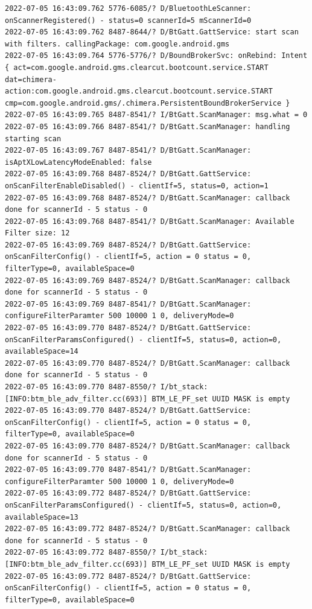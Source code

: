 \documentclass[a4paper,12pt]{book}
\begin{document}
\begin{lstlisting}
2022-07-05 16:43:09.762 5776-6085/? D/BluetoothLeScanner: onScannerRegistered() - status=0 scannerId=5 mScannerId=0
2022-07-05 16:43:09.762 8487-8644/? D/BtGatt.GattService: start scan with filters. callingPackage: com.google.android.gms
2022-07-05 16:43:09.764 5776-5776/? D/BoundBrokerSvc: onRebind: Intent { act=com.google.android.gms.clearcut.bootcount.service.START dat=chimera-action:com.google.android.gms.clearcut.bootcount.service.START cmp=com.google.android.gms/.chimera.PersistentBoundBrokerService }
2022-07-05 16:43:09.765 8487-8541/? I/BtGatt.ScanManager: msg.what = 0
2022-07-05 16:43:09.766 8487-8541/? D/BtGatt.ScanManager: handling starting scan
2022-07-05 16:43:09.767 8487-8541/? D/BtGatt.ScanManager: isAptXLowLatencyModeEnabled: false
2022-07-05 16:43:09.768 8487-8524/? D/BtGatt.GattService: onScanFilterEnableDisabled() - clientIf=5, status=0, action=1
2022-07-05 16:43:09.768 8487-8524/? D/BtGatt.ScanManager: callback done for scannerId - 5 status - 0
2022-07-05 16:43:09.768 8487-8541/? D/BtGatt.ScanManager: Available Filter size: 12
2022-07-05 16:43:09.769 8487-8524/? D/BtGatt.GattService: onScanFilterConfig() - clientIf=5, action = 0 status = 0, filterType=0, availableSpace=0
2022-07-05 16:43:09.769 8487-8524/? D/BtGatt.ScanManager: callback done for scannerId - 5 status - 0
2022-07-05 16:43:09.769 8487-8541/? D/BtGatt.ScanManager: configureFilterParamter 500 10000 1 0, deliveryMode=0
2022-07-05 16:43:09.770 8487-8524/? D/BtGatt.GattService: onScanFilterParamsConfigured() - clientIf=5, status=0, action=0, availableSpace=14
2022-07-05 16:43:09.770 8487-8524/? D/BtGatt.ScanManager: callback done for scannerId - 5 status - 0
2022-07-05 16:43:09.770 8487-8550/? I/bt_stack: [INFO:btm_ble_adv_filter.cc(693)] BTM_LE_PF_set UUID MASK is empty 
2022-07-05 16:43:09.770 8487-8524/? D/BtGatt.GattService: onScanFilterConfig() - clientIf=5, action = 0 status = 0, filterType=0, availableSpace=0
2022-07-05 16:43:09.770 8487-8524/? D/BtGatt.ScanManager: callback done for scannerId - 5 status - 0
2022-07-05 16:43:09.770 8487-8541/? D/BtGatt.ScanManager: configureFilterParamter 500 10000 1 0, deliveryMode=0
2022-07-05 16:43:09.772 8487-8524/? D/BtGatt.GattService: onScanFilterParamsConfigured() - clientIf=5, status=0, action=0, availableSpace=13
2022-07-05 16:43:09.772 8487-8524/? D/BtGatt.ScanManager: callback done for scannerId - 5 status - 0
2022-07-05 16:43:09.772 8487-8550/? I/bt_stack: [INFO:btm_ble_adv_filter.cc(693)] BTM_LE_PF_set UUID MASK is empty 
2022-07-05 16:43:09.772 8487-8524/? D/BtGatt.GattService: onScanFilterConfig() - clientIf=5, action = 0 status = 0, filterType=0, availableSpace=0

\end{lstlisting}
\end{document}
